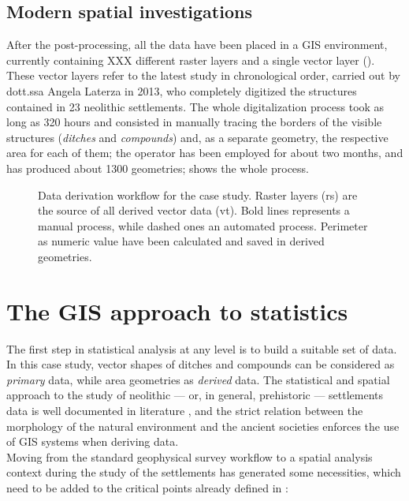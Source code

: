         \subsection{Modern spatial investigations}
            
            After the post-processing, all the data have been placed in a GIS environment, currently containing XXX different raster layers and a single vector layer (). These vector layers refer to the latest study in chronological order, carried out by dott.ssa Angela Laterza in 2013,
            who completely digitized the structures contained in 23 neolithic settlements. The whole digitalization process took as long as 320 hours and consisted in manually tracing the borders of the visible structures (\emph{ditches} and \emph{compounds}) and, as a separate geometry, the respective area for each of them; the operator has been employed for about two months, and has produced about 1300 geometries;  shows the whole process.

            \begin{figure}[htp]
                \resizebox{1.1\textwidth}{!}{%
                    
                }
                \caption[Data deriving workflow for the Tavoliere project]{Data derivation workflow for the case study. Raster layers (\textsf{rs}) are the source of all derived vector data (\textsf{vt}). Bold lines represents a manual process, while dashed ones an automated process. Perimeter as numeric value have been calculated and saved in derived geometries.}
                \label{fig:scheme-derive}
            \end{figure}

    \section{The GIS approach to statistics}
        The first step in statistical analysis at any level is to build a suitable set of data. In this case study, vector shapes of ditches and compounds can be considered as \emph{primary} data, while area geometries as \emph{derived} data.
        The statistical and spatial approach to the study of neolithic --- or, in general, prehistoric --- settlements data is well documented in literature \cite{arch-location-model}, and the strict relation between the morphology of the natural environment and the ancient societies enforces the use of GIS systems when deriving data.\\
        Moving from the standard geophysical survey workflow to a spatial analysis context during the study of the settlements has generated some necessities, which need to be added to the critical points already defined in :

